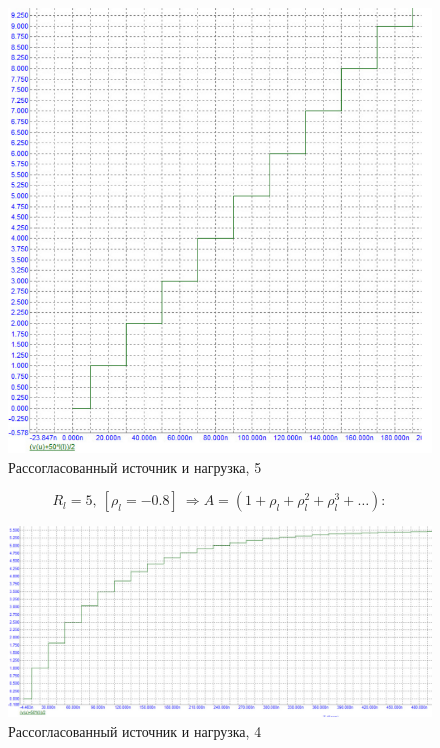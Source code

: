 \documentclass[a4paper, 14pt]{extarticle}%
\begin{document}
\begin{figure}[h!]
			\centering
			\includegraphics[width=1.1\linewidth]{./graphs/18.jpg}
			\caption{Рассогласованный источник и нагрузка, 5}
			\label{4.5}
\end{figure}

\[R_{l}=5, \ \left[\rho_{l}=-0.8\right] \  \Rightarrow A=\left(1+\rho_{l}+\rho_{l}^{2}+\rho_{l}^{3}+\ldots\right) : \]

\newpage

\begin{figure}[h!]
			\centering
			\includegraphics[width=1.1\linewidth]{./graphs/19.jpg}
			\caption{Рассогласованный источник и нагрузка, 4}
			\label{4.4}
\end{figure}
\end{document}
